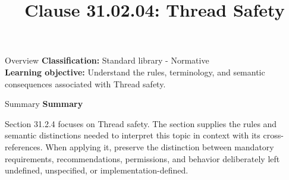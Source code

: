 \documentclass[10pt,letterpaper]{article}
\title{Clause 31.02.04: Thread Safety}
\author{}
\date{}
\begin{document}
\maketitle
\begin{CornellOverviewBox}{Overview}
\textbf{Classification:} Standard library - Normative\\[2pt]
\textbf{Learning objective:} Understand the rules, terminology, and semantic consequences associated with Thread safety.
\end{CornellOverviewBox}\begin{CornellSummaryBox}{Summary}
{\sffamily\bfseries\color{Accent} Summary}\par\vspace{3pt}Section 31.2.4 focuses on Thread safety. The section supplies the rules and semantic distinctions needed to interpret this topic in context with its cross-references. When applying it, preserve the distinction between mandatory requirements, recommendations, permissions, and behavior deliberately left undefined, unspecified, or implementation-defined.
\end{CornellSummaryBox}
\end{document}
